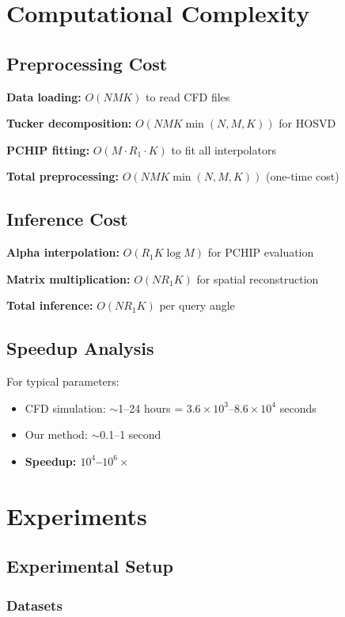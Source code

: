 \documentclass[conference]{IEEEtran}
\begin{document}
\section{Computational Complexity}

\subsection{Preprocessing Cost}

\textbf{Data loading:} $O(NMK)$ to read CFD files

\textbf{Tucker decomposition:} $O(NMK \min(N,M,K))$ for HOSVD

\textbf{PCHIP fitting:} $O(M \cdot R_1 \cdot K)$ to fit all interpolators

\textbf{Total preprocessing:} $O(NMK \min(N,M,K))$ (one-time cost)

\subsection{Inference Cost}

\textbf{Alpha interpolation:} $O(R_1 K \log M)$ for PCHIP evaluation

\textbf{Matrix multiplication:} $O(N R_1 K)$ for spatial reconstruction

\textbf{Total inference:} $O(N R_1 K)$ per query angle

\subsection{Speedup Analysis}

For typical parameters:
\begin{itemize}
    \item CFD simulation: $\sim$1--24 hours = $3.6 \times 10^3$--$8.6 \times 10^4$ seconds
    \item Our method: $\sim$0.1--1 second
    \item \textbf{Speedup: $10^4$--$10^6\times$}
\end{itemize}

\section{Experiments}

\subsection{Experimental Setup}

\subsubsection{Datasets}
\end{document}

